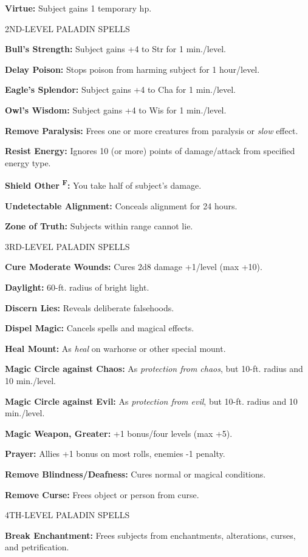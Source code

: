 \documentclass{article}
\begin{document}
\textbf{Virtue:} Subject gains 1 temporary hp.

2ND-LEVEL PALADIN SPELLS

\textbf{Bull's Strength:} Subject gains +4 to Str for 1 min./level.

\textbf{Delay Poison:} Stops poison from harming subject for 1 hour/level.

\textbf{Eagle's Splendor:} Subject gains +4 to Cha for 1 min./level.

\textbf{Owl's Wisdom:} Subject gains +4 to Wis for 1 min./level.

\textbf{Remove Paralysis:} Frees one or more creatures from paralysis or \textit{slow 
}effect.

\textbf{Resist Energy:} Ignores 10 (or more) points of damage/attack from specified 
energy type.

\textbf{Shield Other }\textsuperscript{\textbf{F}}\textbf{:} You take half of subject's 
damage.

\textbf{Undetectable Alignment:} Conceals alignment for 24 hours.

\textbf{Zone of Truth:} Subjects within range cannot lie.

3RD-LEVEL PALADIN SPELLS

\textbf{Cure Moderate Wounds:} Cures 2d8 damage +1/level (max +10).

\textbf{Daylight:} 60-ft. radius of bright light.

\textbf{Discern Lies:} Reveals deliberate falsehoods.

\textbf{Dispel Magic:} Cancels spells and magical effects.

\textbf{Heal Mount:} As \textit{heal }on warhorse or other special mount.

\textbf{Magic Circle against Chaos:} As \textit{protection from chaos}, but 10-ft. 
radius and 10 min./level.

\textbf{Magic Circle against Evil:} As \textit{protection from evil}, but 10-ft. 
radius and 10 min./level.

\textbf{Magic Weapon, Greater:} +1 bonus/four levels (max +5).

\textbf{Prayer:} Allies +1 bonus on most rolls, enemies -1 penalty.

\textbf{Remove Blindness/Deafness:} Cures normal or magical conditions.

\textbf{Remove Curse:} Frees object or person from curse.

4TH-LEVEL PALADIN SPELLS

\textbf{Break Enchantment:} Frees subjects from enchantments, alterations, curses, 
and petrification.
\end{document}
